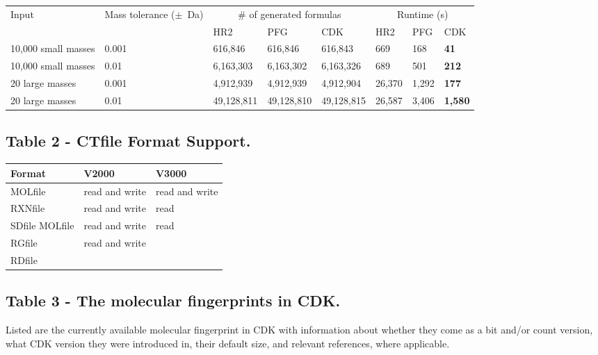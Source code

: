 \documentclass[doublespacing]{bmcart}
\begin{document}
\begin{backmatter}
    \begin{minipage}{1\textwidth}
    \centering
    \begin{tabular}{llllllll}
	\multirow{2}{1in}{Input} & \multirow{2}{1in}{Mass tolerance ($\pm$~Da)} & \multicolumn{3}{c}{\# of generated formulas} & \multicolumn{3}{c}{Runtime (s)} \\
	& & HR2 & PFG & CDK & HR2 & PFG & CDK \\
	10,000 small masses & 0.001 & 616,846 & 616,846 & 616,843 & 669 & 168 & \textbf{41} \\
	10,000 small masses & 0.01 & 6,163,303 & 6,163,302 & 6,163,326 & 689 & 501 & \textbf{212} \\
	20 large masses & 0.001 & 4,912,939 & 4,912,939 & 4,912,904 & 26,370 & 1,292 & \textbf{177} \\
	20 large masses & 0.01 & 49,128,811 & 49,128,810 & 49,128,815 & 26,587 & 3,406 & \textbf{1,580} \\
    \end{tabular}
    \end{minipage}

      \subsection*{Table 2 - CTfile Format Support.}\label{tab:ctfileFormats}

    \begin{minipage}{1\textwidth}
    \renewcommand*{\thempfootnote}{\fnsymbol{mpfootnote}}
    \centering
    \begin{tabular}{lll}
  \textbf{Format}            & \textbf{V2000}  & \textbf{V3000} \\ \hline
    MOLfile & read and write & read and write \\
    RXNfile & read and write & read \\
    SDfile MOLfile & read and write & read \\ %
    RGfile & read and write & \\
    RDfile & & \\ %
    \end{tabular}
    \end{minipage}


  \subsection*{Table 3 - The molecular fingerprints in CDK.}
  \label{tab:fingerprints}
  Listed are the currently available molecular fingerprint in CDK with
  information about whether they come as a bit and/or count version, what CDK version
  they were introduced in, their default size, and relevant
  references, where applicable.
  \baselineskip


\end{backmatter}
\end{document}
